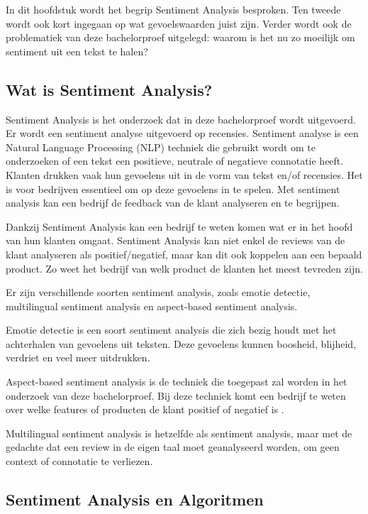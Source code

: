 In dit hoofdstuk wordt het begrip Sentiment Analysis besproken. Ten tweede wordt ook kort ingegaan op wat gevoelswaarden juist zijn. Verder wordt ook de problematiek van deze bachelorproef uitgelegd: waarom is het nu zo moeilijk om sentiment uit een tekst te halen?  

\subsection{Wat is Sentiment Analysis?}
\label{sec:watissentimentanalysis}

Sentiment Analysis is het onderzoek dat in deze bachelorproef wordt uitgevoerd. Er wordt een sentiment analyse uitgevoerd op recensies. Sentiment analyse is een Natural Language Processing (NLP) techniek die gebruikt wordt om te onderzoeken of een tekst een positieve, neutrale of negatieve connotatie heeft. Klanten drukken vaak hun gevoelens uit in de vorm van tekst en/of recensies. Het is voor bedrijven essentieel om op deze gevoelens in te spelen. Met sentiment analysis kan een bedrijf de feedback van de klant analyseren en te begrijpen. \autocite{MonkeyLearn2021}
 
Dankzij Sentiment Analysis kan een bedrijf te weten komen wat er in het hoofd van hun klanten omgaat. Sentiment Analysis kan niet enkel de reviews van de klant analyseren als positief/negatief, maar kan dit ook koppelen aan een bepaald product. Zo weet het bedrijf van welk product de klanten het meest tevreden zijn. \autocite{MonkeyLearn2021}

Er zijn verschillende soorten sentiment analysis, zoals emotie detectie, multilingual sentiment analysis en aspect-based sentiment analysis. 

Emotie detectie is een soort sentiment analysis die zich bezig houdt met het achterhalen van gevoelens uit teksten. Deze gevoelens kunnen boosheid, blijheid, verdriet en veel meer uitdrukken. \autocite{MonkeyLearn2021}

Aspect-based sentiment analysis is de techniek die toegepast zal worden in het onderzoek van deze bachelorproef. Bij deze techniek komt een bedrijf te weten over welke features of producten de klant positief of negatief is .\autocite{MonkeyLearn2021}
 
Multilingual sentiment analysis is hetzelfde als sentiment analysis, maar met de gedachte dat een review in de eigen taal moet geanalyseerd worden, om geen context of connotatie te verliezen. \autocite{MonkeyLearn2021}

\subsection{Sentiment Analysis en Algoritmen}
\label{sec:sentimentanalysisenalgoritmen}


